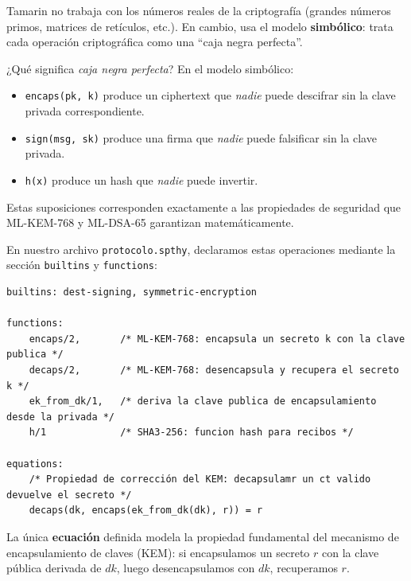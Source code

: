 \documentclass[12pt, a4paper]{article}
\begin{document}
Tamarin no trabaja con los números reales de la criptografía (grandes números
primos, matrices de retículos, etc.). En cambio, usa el modelo
\textbf{simbólico}: trata cada operación criptográfica como una ``caja negra
perfecta''.

\medskip

\begin{cajaConceto}{¿Qué significa \textit{caja negra perfecta}?}
En el modelo simbólico:
\begin{itemize}
  \item \texttt{encaps(pk, k)} produce un ciphertext que \textit{nadie} puede
        descifrar sin la clave privada correspondiente.
  \item \texttt{sign(msg, sk)} produce una firma que \textit{nadie} puede
        falsificar sin la clave privada.
  \item \texttt{h(x)} produce un hash que \textit{nadie} puede invertir.
\end{itemize}
Estas suposiciones corresponden exactamente a las propiedades de seguridad
que ML-KEM-768 y ML-DSA-65 garantizan matemáticamente.
\end{cajaConceto}

\medskip

En nuestro archivo \texttt{protocolo.spthy}, declaramos estas operaciones
mediante la sección \texttt{builtins} y \texttt{functions}:

\begin{lstlisting}[caption={Declaración de primitivas criptográficas en Tamarin.}]
builtins: dest-signing, symmetric-encryption

functions:
    encaps/2,       /* ML-KEM-768: encapsula un secreto k con la clave publica */
    decaps/2,       /* ML-KEM-768: desencapsula y recupera el secreto k */
    ek_from_dk/1,   /* deriva la clave publica de encapsulamiento desde la privada */
    h/1             /* SHA3-256: funcion hash para recibos */

equations:
    /* Propiedad de corrección del KEM: decapsulamr un ct valido devuelve el secreto */
    decaps(dk, encaps(ek_from_dk(dk), r)) = r
\end{lstlisting}

La única \textbf{ecuación} definida modela la propiedad fundamental del
mecanismo de encapsulamiento de claves (KEM): si encapsulamos un secreto $r$
con la clave pública derivada de $dk$, luego desencapsulamos con $dk$,
recuperamos $r$.

\end{document}
